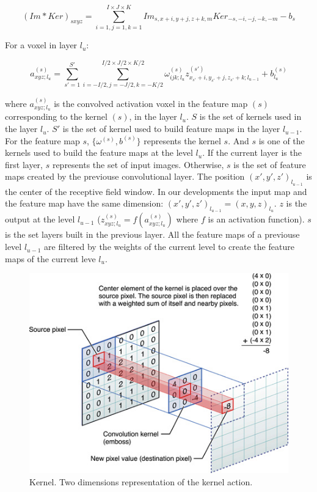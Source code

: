 \documentclass[final, paper=letter,5p,times,twocolumn]{elsarticle}
\begin{document}
\begin{equation*}
    (Im*Ker)_{sxyz} = \sum_{i=1,j=1,k=1}^{I \times J \times K} Im_{s,x+i,y+j,z+k,m}Ker_{-s,-i,-j,-k,-m} - b_{s}
  \label{eq:convolution_tot} 
\end{equation*}

For a voxel in layer $l_{u}$:

\begin{equation}
    a_{xyz;l_{u}}^{(s)} =  \sum_{s'=1}^{S'}\sum_{i=-I/2,j=-J/2,k=-K/2}^{I/2 \times J/2 \times K/2}\omega_{ijk;l_{u}}^{(s)}z_{x_{s'}+i,y_{s'}+j,z_{s'}+k;l_{u-1}}^{(s')} + b_{l_{u}}^{(s)}
  \label{eq:convolution_tot_vox} 
\end{equation}

where $a_{xyz;l_{u}}^{(s)}$ is the convolved activation voxel in the feature map $(s)$ corresponding to the kernel $(s)$, in the layer $l_{u}$. $S$ is the set of kernels used in the layer $l_{u}$. $S'$ is the set of kernel used to build feature maps in the layer $l_{u-1}$. For the feature map $s$, $\{\omega^{(s)}, b^{(s)}\}$ represents the kernel $s$. And $s$ is one of the kernels used to build the feature maps at the level $l_{u}$. If the current layer is the first layer, $s$ represents the set of input images. Otherwise, $s$ is the set of feature maps created by the previouse convolutional layer. The position $(x',y',z')_{l_{u-1}}$ is the center of the receptive field window. In our developments the input map and the feature map have the same dimension: $(x',y',z')_{l_{u-1}} = (x,y,z)_{l_{u}}$. $z$ is the output at the level $l_{u-1}$ ($z_{xyz;l_{u}}^{(s)} = f(a_{xyz;l_{u}}^{(s)})$ where $f$ is an activation function). $s$ is the set layers built in the previous layer. All the feature maps of a previouse level $l_{u-1}$ are filtered by the weights of the current level to create the feature maps of the current leve $l_{u}$.



\begin{figure}[htbp]
   \begin{center}
      \includegraphics[scale=0.3, angle=0]{images/GvsBA.jpg}
   \end{center}
   \caption{Kernel. Two dimensions representation of the kernel action.}
  \label{fig:Kernel} 
\end{figure}
\end{document}
